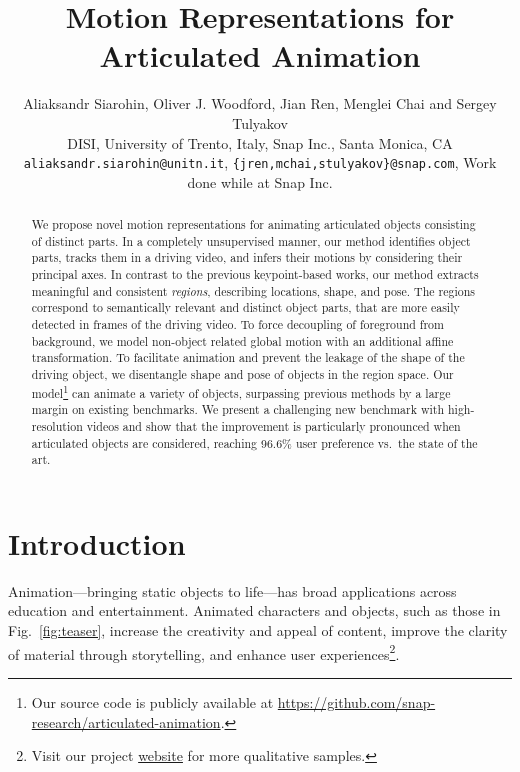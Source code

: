 \documentclass[final]{cvpr}
\begin{document}
\title{Motion Representations for Articulated Animation}
\author{Aliaksandr Siarohin, Oliver J. Woodford, Jian Ren, Menglei Chai and Sergey Tulyakov\\
DISI, University of Trento, Italy, Snap Inc., Santa Monica, CA
\\
{\tt\small aliaksandr.siarohin@unitn.it},
{\tt\small \{jren,mchai,stulyakov\}@snap.com},
{\scriptsize Work done while at Snap Inc.}}
\maketitle

\begin{abstract}


We propose novel motion representations for animating articulated objects consisting of distinct parts. 
In a completely unsupervised manner, our method identifies object parts, tracks them in a driving video, and infers their motions by considering their principal axes. 
In contrast to the previous keypoint-based works, our method extracts meaningful and consistent \emph{regions}, describing locations, shape, and pose. The regions correspond to semantically relevant and distinct object parts, that are more easily detected in frames of the driving video. To force decoupling of foreground from background, we model non-object related global motion with an additional affine transformation. 
To facilitate animation and prevent the leakage of the shape of the driving object, we disentangle shape and pose of objects in the region space.
Our model\footnote{Our source code is publicly available at \href{https://github.com/snap-research/articulated-animation}{https://github.com/snap-research/articulated-animation}.} can animate a variety of objects, surpassing previous methods by a large margin on existing benchmarks. We present a challenging new benchmark with high-resolution videos and show that the improvement is particularly pronounced when articulated objects are considered, reaching 96.6\% user preference vs.\ the state of the art. 
\end{abstract}

\vspace{-0.4cm}
\section{Introduction}
\label{sec:intro}
\vspace{-0.2cm}
Animation---bringing static objects to life---has broad applications across education and entertainment. Animated characters and objects, such as those in Fig.~\ref{fig:teaser}, increase the creativity and appeal of content, improve the clarity of material through storytelling, and enhance user experiences\footnote{Visit our project \href{https://snap-research.github.io/articulated-animation}{website} for more qualitative samples.}.  
\end{document}
